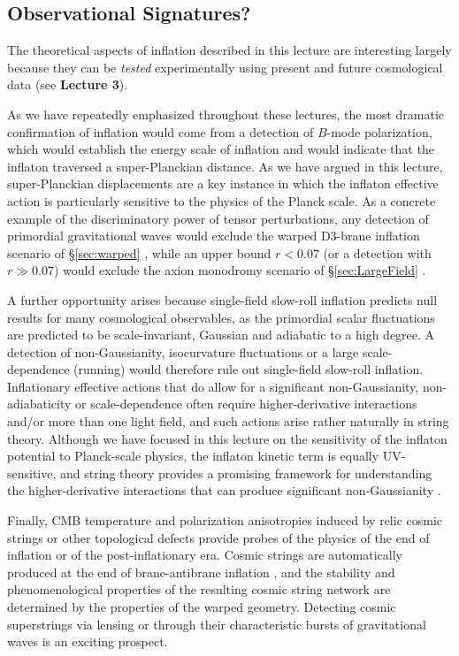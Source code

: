 \documentclass[12pt,letterpaper,rotate]{article}
\begin{document}
{\subsection{Observational Signatures?}
\label{sec:obs}

The theoretical aspects of inflation described in this lecture are interesting largely because they can be {\it tested} experimentally using
present and future cosmological data (see {\bf Lecture 3}).  



As we have repeatedly emphasized throughout these lectures,
the most dramatic confirmation of inflation would come from a detection of $B$-mode polarization, which would establish the energy scale of inflation and would indicate that the inflaton traversed a super-Planckian distance.
As we have argued in this lecture, super-Planckian displacements are a key instance in which the inflaton effective action is particularly sensitive to the physics of the Planck scale.  As  a concrete example of  the discriminatory power of tensor perturbations, any detection of primordial gravitational waves would exclude the warped D3-brane inflation scenario of \S\ref{sec:warped} \cite{Baumann:2006cd}, while an upper bound $r<0.07$  (or a detection with $r\gg 0.07$) would exclude the axion monodromy scenario of \S\ref{sec:LargeField} \cite{MSW}.

A further opportunity arises because single-field slow-roll inflation predicts null results for many cosmological observables, as the primordial scalar fluctuations are predicted to be scale-invariant, Gaussian and adiabatic to a high degree.  A detection of non-Gaussianity, isocurvature fluctuations or a large scale-dependence (running) would therefore rule out single-field slow-roll inflation.  Inflationary effective actions that do allow for a significant non-Gaussianity, non-adiabaticity or scale-dependence often require higher-derivative interactions and/or more than one light field, and such actions arise rather naturally in string theory.  Although we have focused in this lecture on the sensitivity of the inflaton potential to Planck-scale physics, the inflaton kinetic term is equally UV-sensitive, and string theory provides a promising framework for understanding the higher-derivative interactions that can produce significant non-Gaussianity \cite{DBI,Alishahiha:2004eh}.

Finally, CMB temperature and polarization anisotropies induced by relic cosmic strings or other topological defects provide probes of the physics of the end of inflation or of the post-inflationary era.
Cosmic strings are automatically produced at the end of brane-antibrane inflation \cite{Sarangi, CMP},
and the stability and phenomenological properties of the resulting cosmic string network are determined by the properties of the warped geometry.  Detecting cosmic superstrings via lensing or through their characteristic bursts of gravitational waves is an exciting prospect.\\

}
\end{document}
